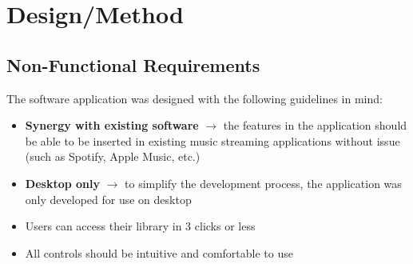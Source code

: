\chapter{Design/Method}

\section{Non-Functional Requirements}
The software application was designed with the following guidelines in mind:\begin{itemize}
    \item \textbf{
        Synergy with existing software
    } \(\to\) the features in the application should be able to be inserted in existing music streaming applications without issue (such as Spotify, Apple Music, etc.) %
    \item \textbf{
        Desktop only
    } \(\to\) to simplify the development process, the application was only developed for use on desktop
    \item Users can access their library in 3 clicks or less %
    \item All controls should be intuitive and comfortable to use
\end{itemize} %

